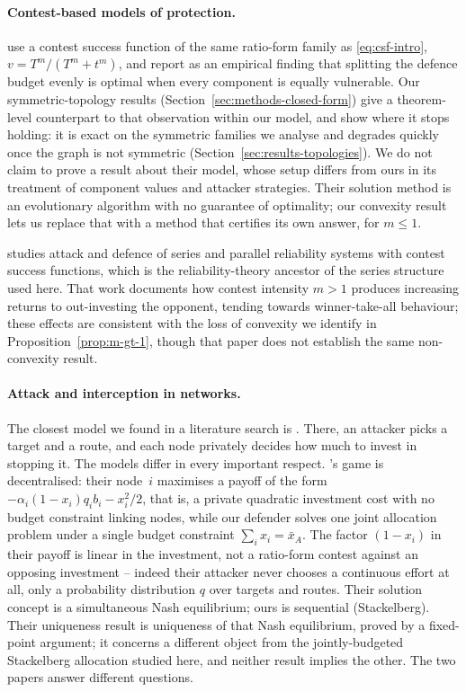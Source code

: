 \documentclass[11pt,a4paper]{article}
\theoremstyle{plain}
\theoremstyle{definition}
\newcommand{\XA}{\bar{x}_A}
\begin{document}
\paragraph{Contest-based models of protection.}
\citet{ramirez2011} use a contest success function of the same ratio-form
family as \eqref{eq:csf-intro}, $v=T^m/(T^m+t^m)$, and report as an
empirical finding that splitting the defence budget evenly is optimal when
every component is equally vulnerable. Our symmetric-topology results
(Section~\ref{sec:methods-closed-form}) give a theorem-level counterpart
to that observation within our model, and show where it stops holding: it
is exact on the symmetric families we analyse and degrades quickly once
the graph is not symmetric (Section~\ref{sec:results-topologies}). We do
not claim to prove a result about their model, whose setup differs from
ours in its treatment of component values and attacker strategies. Their
solution method is an evolutionary algorithm with no guarantee of
optimality; our convexity result lets us replace that with a method that
certifies its own answer, for $m\le1$.

\citet{hausken2008} studies attack and defence of series and parallel
reliability systems with contest success functions, which is the
reliability-theory ancestor of the series structure used here. That work
documents how contest intensity $m>1$ produces increasing returns to
out-investing the opponent, tending towards winner-take-all behaviour;
these effects are consistent with the loss of convexity we identify in
Proposition~\ref{prop:m-gt-1}, though that paper does not establish the
same non-convexity result.

\paragraph{Attack and interception in networks.}
The closest model we found in a literature search is \citet{bloch2023}.
There, an attacker picks a target and a route, and each node privately
decides how much to invest in stopping it. The models differ in every
important respect. \citeauthor{bloch2023}'s game is decentralised: their node~$i$ maximises
a payoff of the form $-\alpha_i(1-x_i)q_ib_i-x_i^2/2$, that is, a private
quadratic investment cost with no budget constraint linking nodes, while
our defender solves one joint allocation problem under a single budget
constraint $\sum_i x_i=\XA$. The factor $(1-x_i)$ in their payoff is
linear in the investment, not a ratio-form contest against an opposing
investment -- indeed their attacker never chooses a continuous effort at
all, only a probability distribution $q$ over targets and routes. Their solution concept
is a simultaneous Nash equilibrium; ours is sequential (Stackelberg). Their
uniqueness result is uniqueness of that Nash equilibrium, proved by a
fixed-point argument; it concerns a different object from the
jointly-budgeted Stackelberg allocation studied here, and neither result
implies the other. The two papers answer different questions.
\end{document}
